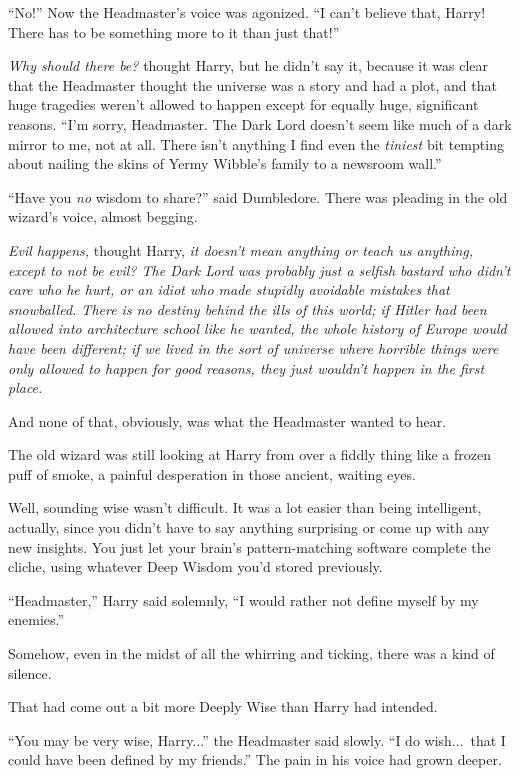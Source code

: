 “No!” Now the Headmaster’s voice was agonized. “I can’t believe that, Harry! There has to be something more to it than just that!”

\emph{Why should there be?} thought Harry, but he didn’t say it, because it was clear that the Headmaster thought the universe was a story and had a plot, and that huge tragedies weren’t allowed to happen except for equally huge, significant reasons. “I’m sorry, Headmaster. The Dark Lord doesn’t seem like much of a dark mirror to me, not at all. There isn’t anything I find even the \emph{tiniest} bit tempting about nailing the skins of Yermy Wibble’s family to a newsroom wall.”

“Have you \emph{no} wisdom to share?” said Dumbledore. There was pleading in the old wizard’s voice, almost begging.

\emph{Evil happens,} thought Harry, \emph{it doesn’t mean anything or teach us anything, except to not be evil? The Dark Lord was probably just a selfish bastard who didn’t care who he hurt, or an idiot who made stupidly avoidable mistakes that snowballed. There is no destiny behind the ills of this world; if Hitler had been allowed into architecture school like he wanted, the whole history of Europe would have been different; if we lived in the sort of universe where horrible things were only allowed to happen for good reasons, they just wouldn’t happen in the first place.}

And none of that, obviously, was what the Headmaster wanted to hear.

The old wizard was still looking at Harry from over a fiddly thing like a frozen puff of smoke, a painful desperation in those ancient, waiting eyes.

Well, sounding wise wasn’t difficult. It was a lot easier than being intelligent, actually, since you didn’t have to say anything surprising or come up with any new insights. You just let your brain’s pattern-matching software complete the cliche, using whatever Deep Wisdom you’d stored previously.

“Headmaster,” Harry said solemnly, “I would rather not define myself by my enemies.”

Somehow, even in the midst of all the whirring and ticking, there was a kind of silence.

That had come out a bit more Deeply Wise than Harry had intended.

“You may be very wise, Harry...” the Headmaster said slowly. “I do wish...\ that I could have been defined by my friends.” The pain in his voice had grown deeper.

